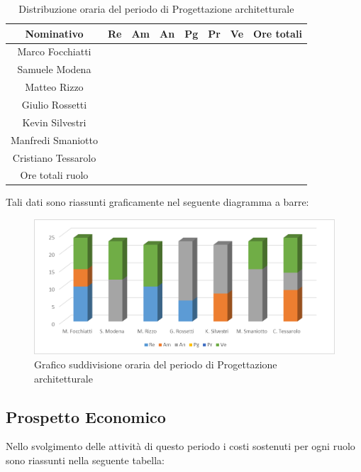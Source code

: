 \documentclass[./PianodiProgetto.tex]{subfiles}
\begin{document}
\begin{table}[H]
	\centering
	\begin{tabular}{|c|cccccc|c|}
		\hline
		Nominativo&Re&Am&An&Pg&Pr&Ve&Ore totali\\ \hline
		Marco Focchiatti& & & & & & & \\ \hline
		Samuele Modena& & & & & & & \\ \hline
		Matteo Rizzo& & & & & & & \\ \hline
		Giulio Rossetti& & & & & & & \\ \hline
		Kevin Silvestri& & & & & & & \\ \hline
		Manfredi Smaniotto& & & & & & & \\ \hline
		Cristiano Tessarolo& & & & & & & \\  \hline
		Ore totali ruolo& & & & & & & \\ \hline
	\end{tabular}
	\caption{Distribuzione oraria del periodo di Progettazione architetturale}
\end{table}

Tali dati sono riassunti graficamente nel seguente diagramma a barre:
\begin{figure}[H]
	\centering
	\includegraphics[width=1\linewidth]{img/grafici/ProgettazioneArchitetturaleProspettoOrario}
	\caption{Grafico suddivisione oraria del periodo di Progettazione architetturale}
	\label{fig:progettazione-architetturale-prospetto-orario}
\end{figure}

\subsection{Prospetto Economico}
Nello svolgimento delle attività di questo periodo i costi sostenuti per ogni ruolo sono riassunti nella seguente tabella:
\end{document}
